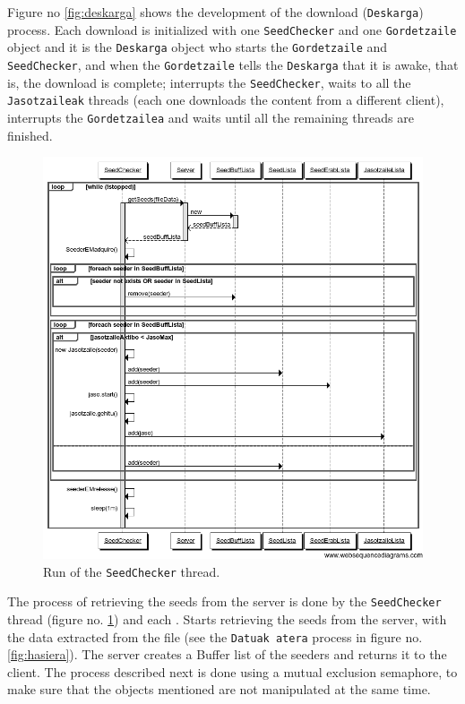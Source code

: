 Figure no \ref{fig:deskarga} shows the development of the download (\texttt{Deskarga}) process. Each download is initialized with one \texttt{SeedChecker} and one \texttt{Gordetzaile} object and it is the \texttt{Deskarga} object who starts the \texttt{Gordetzaile} and \texttt{SeedChecker}, and when the \texttt{Gordetzaile} tells the \texttt{Deskarga} that it is awake, that is, the download is complete; interrupts the \texttt{SeedChecker}, waits to all the \texttt{Jasotzaileak} threads (each one downloads the content from a different client), interrupts the \texttt{Gordetzailea} and waits until all the remaining threads are finished.

\begin{figure}
   \centering
   \includegraphics[scale=0.5]{irudiak/seedaktxekeatu.png}
   \caption{Run of the \texttt{SeedChecker} thread.}
   \label{fig:seedtxeker}
\end{figure}  

The process of retrieving the seeds from the server is done by the \texttt{SeedChecker} thread (figure no. \ref{fig:seedtxeker}) and each . Starts retrieving the seeds from the server, with the data extracted from the file (see the \texttt{Datuak atera} process in figure no. \ref{fig:hasiera}). The server creates a Buffer list of the seeders and returns it to the client. The process described next is done using a mutual exclusion semaphore, to make sure that the objects mentioned are not manipulated at the same time. 

